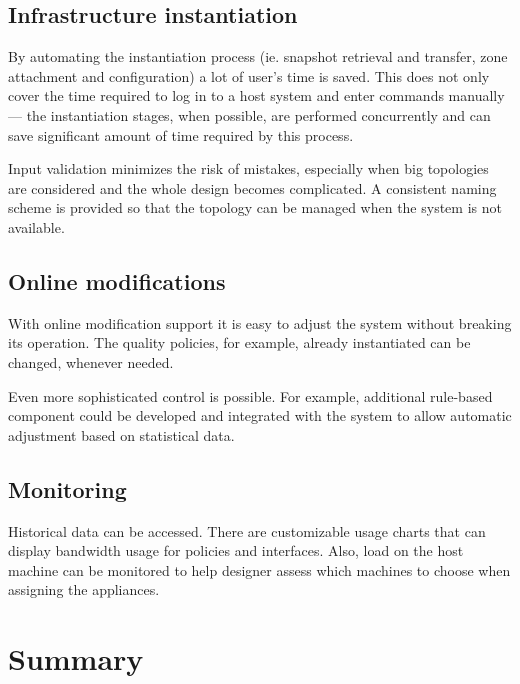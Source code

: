 \documentclass[11pt]{book}
\begin{document}
      \subsection{Infrastructure instantiation}
      \label{sub:uc:enhance:instantiation}

        By automating the instantiation process (ie. snapshot retrieval and transfer, zone attachment and configuration)
        a lot of user's time is saved. This does not only cover the time required to log in to a host system and enter
        commands manually --- the instantiation stages, when possible, are performed concurrently and can save
        significant amount of time required by this process.

        Input validation minimizes the risk of mistakes, especially when big topologies are considered and the whole
        design becomes complicated. A consistent naming scheme is provided so that the topology can be managed when the
        system is not available.



      \subsection{Online modifications}
      \label{sub:uc:enhance:online}

        With online modification support it is easy to adjust the system without breaking its operation. The quality
        policies, for example, already instantiated can be changed, whenever needed.

        Even more sophisticated control is possible. For example, additional rule-based component could be developed and
        integrated with the system to allow automatic adjustment based on statistical data.


      \subsection{Monitoring}
      \label{sub:uc:enhance:monitoring}

        Historical data can be accessed. There are customizable usage charts that can display bandwidth usage for
        policies and interfaces. Also, load on the host machine can be monitored to help designer assess which machines
        to choose when assigning the appliances.


    \section*{Summary}
\end{document}
